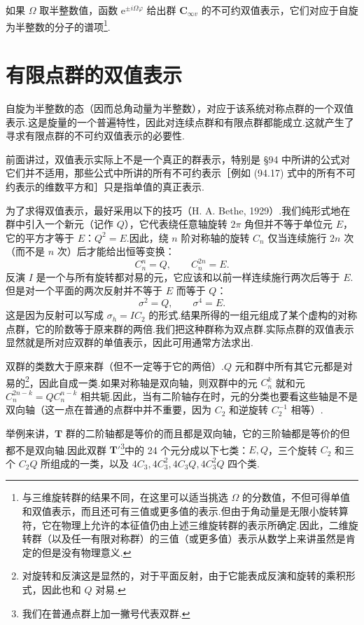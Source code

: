 如果 $\Omega$ 取半整数值，函数 $\mathrm{e}^{\pm i\Omega\varphi}$ 给出群 $\boldsymbol{C}_{\infty v}$ 的不可约双值表示，它们对应于自旋为半整数的分子的谱项\footnote{与三维旋转群的结果不同，在这里可以适当挑选 $\Omega$ 的分数值，不但可得单值和双值表示，而且还可有三值或更多值的表示.但由于角动量是无限小旋转算符，它在物理上允许的本征值仍由上述三维旋转群的表示所确定.因此，二维旋转群（以及任一有限对称群）的三值（或更多值）表示从数学上来讲虽然是肯定的但是没有物理意义.}.

\section{有限点群的双值表示}

自旋为半整数的态（因而总角动量为半整数），对应于该系统对称点群的一个双值表示.这是旋量的一个普遍特性，因此对连续点群和有限点群都能成立.这就产生了寻求有限点群的不可约双值表示的必要性.

前面讲过，双值表示实际上不是一个真正的群表示，特别是 §94 中所讲的公式对它们并不适用，那些公式中所讲的所有不可约表示［例如 (94.17) 式中的所有不可约表示的维数平方和］只是指单值的真正表示.

为了求得双值表示，最好采用以下的技巧（H. A. Bethe, 1929）.我们纯形式地在群中引入一个新元（记作 $Q$），它代表绕任意轴旋转 $2\pi$ 角但并不等于单位元 $E$，它的平方才等于 $E$：$Q^2=E$.因此，绕 $n$ 阶对称轴的旋转 $C_n$ 仅当连续施行 $2n$ 次（而不是 $n$ 次）后才能给出恒等变换：
\begin{equation}
  C_n^n=Q,\qquad C_n^{2n}=E.
\end{equation}
反演 $I$ 是一个与所有旋转都对易的元，它应该和以前一样连续施行两次后等于 $E$.但是对一个平面的两次反射并不等于 $E$ 而等于 $Q$：
\begin{equation}
  \sigma^2=Q,\qquad \sigma^4=E.
\end{equation}
这是因为反射可以写成 $\sigma_h=IC_2$ 的形式.结果所得的一组元组成了某个虚构的对称点群，它的阶数等于原来群的两倍.我们把这种群称为双点群.实际点群的双值表示显然就是所对应双群的单值表示，因此可用通常方法求出.

双群的类数大于原来群（但不一定等于它的两倍）.$Q$ 元和群中所有其它元都是对易的\footnote{对旋转和反演这是显然的，对于平面反射，由于它能表成反演和旋转的乘积形式，因此也和 $Q$ 对易.}，因此自成一类.如果对称轴是双向轴，则双群中的元 $C_n^k$ 就和元 $C_n^{2n-k}=QC_n^{n-k}$ 相共轭.因此，当有二阶轴存在时，元的分类也要看这些轴是不是双向轴（这一点在普通的点群中并不重要，因为 $C_2$ 和逆旋转 $C_2^{-1}$ 相等）.

举例来讲，$\boldsymbol{T}$ 群的二阶轴都是等价的而且都是双向轴，它的三阶轴都是等价的但都不是双向轴.因此双群 $\boldsymbol{T}'$\footnote{我们在普通点群上加一撇号代表双群.}中的 24 个元分成以下七类：$E,Q$，三个旋转 $C_2$ 和三个 $C_2Q$ 所组成的一类，以及 $4C_3,4C_3^2,4C_3Q,4C_3^2Q$ 四个类.


